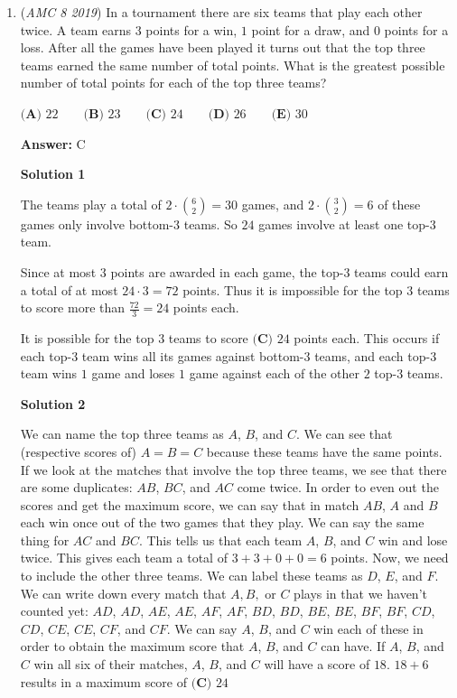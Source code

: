 \begin{enumerate}
 - Happytwin

 Associated video

 Solution detailing how to solve the problem: 

 


	\item (\textit{AMC 8 2019}) In a tournament there are six teams that play each other twice. A team earns $3$ points for a win, $1$ point for a draw, and $0$ points for a loss. After all the games have been played it turns out that the top three teams earned the same number of total points. What is the greatest possible number of total points for each of the top three teams?


 $\textbf{(A) }22\qquad\textbf{(B) }23\qquad\textbf{(C) }24\qquad\textbf{(D) }26\qquad\textbf{(E) }30$

 \textbf{Answer: }C



\textbf{Solution 1}

The teams play a total of $2 \cdot \binom{6}{2} = 30$ games, and $2 \cdot \binom{3}{2} = 6$ of these games only involve bottom-$3$ teams.  So $24$ games involve at least one top-$3$ team.  

 Since at most $3$ points are awarded in each game, the top-$3$ teams could earn a total of at most $24 \cdot 3 = 72$ points.  Thus it is impossible for the top $3$ teams to score more than $\frac{72}{3} = 24$ points each.

 It is possible for the top $3$ teams to score $\boxed{\textbf {(C) }24}$ points each.  This occurs if each top-$3$ team wins all its games against bottom-$3$ teams, and each top-$3$ team wins $1$ game and loses $1$ game against each of the other $2$ top-$3$ teams.

 



\textbf{Solution 2}

We can name the top three teams as $A$, $B$, and $C$. We can see that (respective scores of) $A=B=C$ because these teams have the same points. If we look at the matches that involve the top three teams, we see that there are some duplicates: $AB$, $BC$, and $AC$ come twice. In order to even out the scores and get the maximum score, we can say that in match $AB$, $A$ and $B$ each win once out of the two games that they play. We can say the same thing for $AC$ and $BC$. This tells us that each team $A$, $B$, and $C$ win and lose twice. This gives each team a total of $3 + 3 + 0 + 0 = 6$ points. Now, we need to include the other three teams. We can label these teams as $D$, $E$, and $F$. We can write down every match that $A, B,$ or $C$ plays in that we haven't counted yet: $AD$, $AD$, $AE$, $AE$, $AF$, $AF$, $BD$, $BD$, $BE$, $BE$, $BF$, $BF$, $CD$, $CD$, $CE$, $CE$, $CF$, and $CF$. We can say $A$, $B$, and $C$ win each of these in order to obtain the maximum score that $A$, $B$, and $C$ can have. If $A$, $B$, and $C$ win all six of their matches, $A$, $B$, and $C$ will have a score of $18$. $18 + 6$ results in a maximum score of $\boxed{\textbf{(C) }24}$





\end{enumerate}
